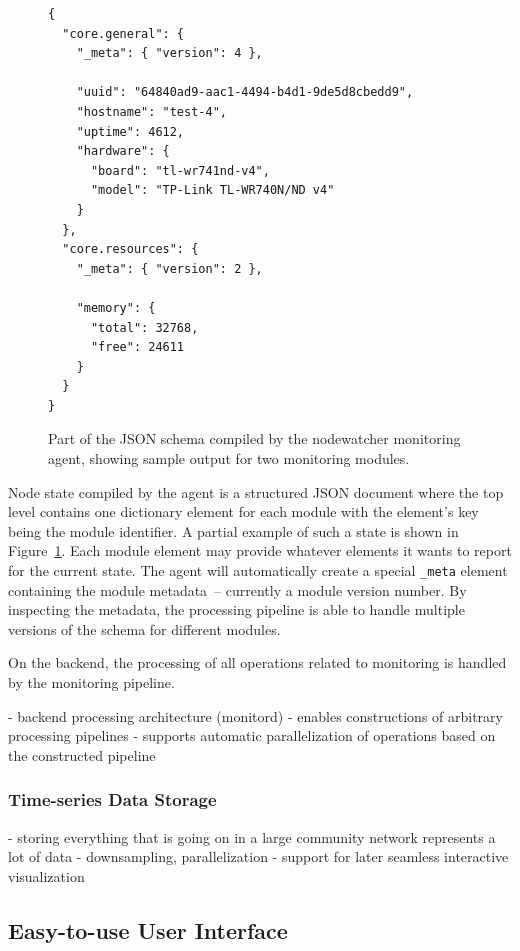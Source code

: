\documentclass[5p,sort&compress]{elsarticle}
\begin{document}
\begin{figure}
\centering
\begin{verbatim}
{
  "core.general": {
    "_meta": { "version": 4 },
    
    "uuid": "64840ad9-aac1-4494-b4d1-9de5d8cbedd9",
    "hostname": "test-4",
    "uptime": 4612,
    "hardware": {
      "board": "tl-wr741nd-v4",
      "model": "TP-Link TL-WR740N/ND v4"
    }
  },
  "core.resources": {
    "_meta": { "version": 2 },
    
    "memory": {
      "total": 32768,
      "free": 24611
    }
  }
}
\end{verbatim}
\caption{Part of the JSON schema compiled by the nodewatcher monitoring agent, showing sample output for two monitoring modules.}
\label{fig:monitoring-json-schema}
\end{figure}

Node state compiled by the agent is a structured JSON document where the top level contains one dictionary element for each module with the element's key being the module identifier.
A partial example of such a state is shown in Figure~\ref{fig:monitoring-json-schema}.
Each module element may provide whatever elements it wants to report for the current state.
The agent will automatically create a special \texttt{\_meta} element containing the module metadata~-- currently a module version number.
By inspecting the metadata, the processing pipeline is able to handle multiple versions of the schema for different modules.

On the backend, the processing of all operations related to monitoring is handled by the monitoring pipeline.

- backend processing architecture (monitord)
  - enables constructions of arbitrary processing pipelines
  - supports automatic parallelization of operations based on the constructed pipeline

\subsubsection{Time-series Data Storage}

- storing everything that is going on in a large community network represents a lot of data
- downsampling, parallelization
- support for later seamless interactive visualization

\subsection{Easy-to-use User Interface}
\end{document}
